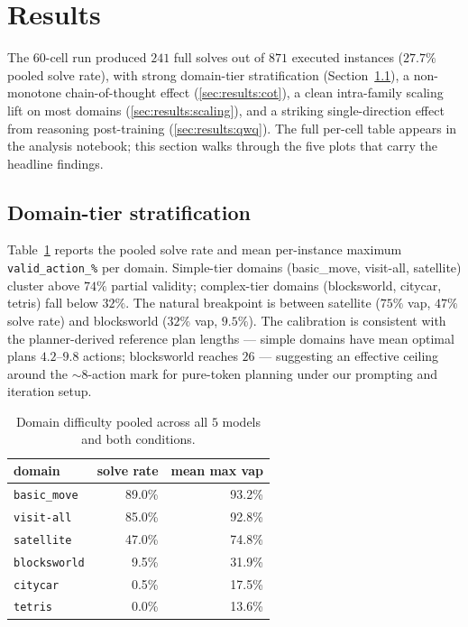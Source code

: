 
\section{Results}
\label{sec:results}

The 60-cell run produced $241$ full solves out of $871$ executed
instances ($27.7\%$ pooled solve rate), with strong domain-tier
stratification (Section~\ref{sec:results:matrix}), a non-monotone
chain-of-thought effect (\ref{sec:results:cot}), a clean intra-family
scaling lift on most domains (\ref{sec:results:scaling}), and a
striking single-direction effect from reasoning post-training
(\ref{sec:results:qwq}). The full per-cell table appears in the
analysis notebook; this section walks through the five plots that
carry the headline findings.

\subsection{Domain-tier stratification}
\label{sec:results:matrix}

Table~\ref{tab:domain-rank} reports the pooled solve rate and mean
per-instance maximum \texttt{valid\_action\_\%} per domain.
Simple-tier domains (basic\_move, visit-all, satellite) cluster above
$74\%$ partial validity; complex-tier domains
(blocksworld, citycar, tetris) fall below $32\%$. The natural
breakpoint is between satellite ($75\%$ vap, $47\%$ solve rate) and
blocksworld ($32\%$ vap, $9.5\%$). The calibration is consistent with
the planner-derived reference plan lengths --- simple domains have
mean optimal plans $4.2$--$9.8$ actions; blocksworld reaches $26$ ---
suggesting an effective ceiling around the $\sim$8-action mark for
pure-token planning under our prompting and iteration setup.

\begin{table}[h]
\centering\small
\begin{tabular}{lrr}
\toprule
domain & solve rate & mean max vap \\
\midrule
\texttt{basic\_move}   & 89.0\% & 93.2\% \\
\texttt{visit-all}     & 85.0\% & 92.8\% \\
\texttt{satellite}     & 47.0\% & 74.8\% \\[2pt]
\texttt{blocksworld}   &  9.5\% & 31.9\% \\
\texttt{citycar}       &  0.5\% & 17.5\% \\
\texttt{tetris}        &  0.0\% & 13.6\% \\
\bottomrule
\end{tabular}
\caption{Domain difficulty pooled across all $5$ models and both
conditions.}
\label{tab:domain-rank}
\end{table}

